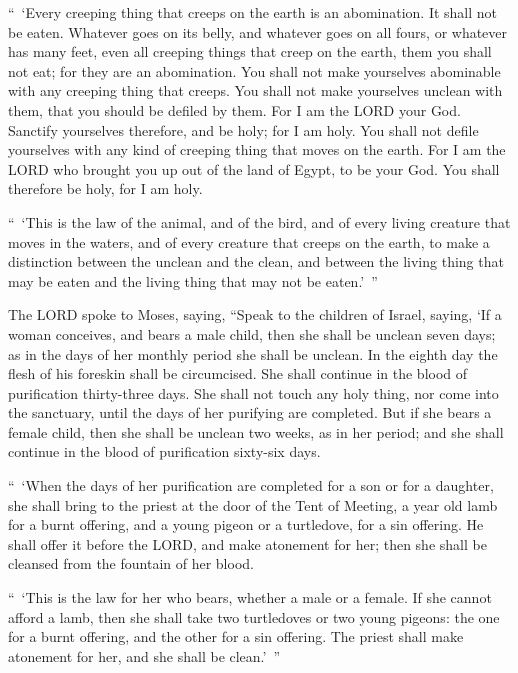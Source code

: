 \myverse{}“ ‘Every creeping thing that creeps on the earth is an abomination.
It shall not be eaten.
\myverse{}Whatever goes on its belly, and whatever goes on all fours, or whatever has
many feet, even all creeping things that creep on the earth, them you shall not eat; for they are an abomination.
\myverse{}You shall not make yourselves abominable with any creeping thing that creeps.
You shall not make yourselves unclean with them, that you should be defiled by them.
\myverse{}For I am the LORD your God. Sanctify yourselves therefore, and be holy; for
I am holy. You shall not defile yourselves with any kind of creeping thing that moves on the earth.
\myverse{}For I am the LORD who brought you up out of the land of Egypt, to be your
God. You shall therefore be holy, for I am holy.


\myverse{}“ ‘This is the law of the animal, and of the bird, and of every
living creature that moves in the waters, and of every creature that creeps on the earth,
\myverse{}to make a distinction between the unclean and the clean, and between the
living thing that may be eaten and the living thing that may not be eaten.’ ”


\mychapter{} \myverse*{}The LORD spoke to Moses, saying,
\myverse{}“Speak to the children of Israel, saying, ‘If a woman conceives, and bears
a male child, then she shall be unclean seven days; as in the days of her monthly period she shall be
unclean.
\myverse{}In the eighth day the flesh of his foreskin shall be circumcised.
\myverse{}She shall continue in the blood of purification thirty-three days. She shall
not touch any holy thing, nor come into the sanctuary, until the days of her purifying are completed.
\myverse{}But if she bears a female child, then she shall be unclean two weeks, as in
her period; and she shall continue in the blood of purification sixty-six days.


\myverse{}“ ‘When the days of her purification are completed for a son or
for a daughter, she shall bring to the priest at the door of the Tent of Meeting, a year old lamb for
a burnt offering, and a young pigeon or a turtledove, for a sin offering.
\myverse{}He shall offer it before the LORD, and make atonement for her; then she shall
be cleansed from the fountain of her blood.

“ ‘This is the law for her who bears, whether a male or a female.
\myverse{}If she cannot afford a lamb, then she shall take two turtledoves or two young
pigeons: the one for a burnt offering, and the other for a sin offering. The priest shall make atonement
for her, and she shall be clean.’ ”


